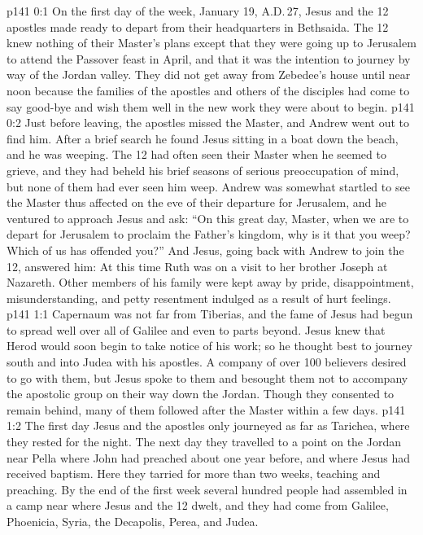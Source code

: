 \author{Midwayer Commission}
\vs p141 0:1 On the first day of the week, January 19, A.D.\,27, Jesus and the 12 apostles made ready to depart from their headquarters in Bethsaida. The 12 knew nothing of their Master’s plans except that they were going up to Jerusalem to attend the Passover feast in April, and that it was the intention to journey by way of the Jordan valley. They did not get away from Zebedee’s house until near noon because the families of the apostles and others of the disciples had come to say good\hyp{}bye and wish them well in the new work they were about to begin.
\vs p141 0:2 Just before leaving, the apostles missed the Master, and Andrew went out to find him. After a brief search he found Jesus sitting in a boat down the beach, and he was weeping. The 12 had often seen their Master when he seemed to grieve, and they had beheld his brief seasons of serious preoccupation of mind, but none of them had ever seen him weep. Andrew was somewhat startled to see the Master thus affected on the eve of their departure for Jerusalem, and he ventured to approach Jesus and ask: “On this great day, Master, when we are to depart for Jerusalem to proclaim the Father’s kingdom, why is it that you weep? Which of us has offended you?” And Jesus, going back with Andrew to join the 12, answered him:  At this time Ruth was on a visit to her brother Joseph at Nazareth. Other members of his family were kept away by pride, disappointment, misunderstanding, and petty resentment indulged as a result of hurt feelings.
\vs p141 1:1 Capernaum was not far from Tiberias, and the fame of Jesus had begun to spread well over all of Galilee and even to parts beyond. Jesus knew that Herod would soon begin to take notice of his work; so he thought best to journey south and into Judea with his apostles. A company of over 100 believers desired to go with them, but Jesus spoke to them and besought them not to accompany the apostolic group on their way down the Jordan. Though they consented to remain behind, many of them followed after the Master within a few days.
\vs p141 1:2 The first day Jesus and the apostles only journeyed as far as Tarichea, where they rested for the night. The next day they travelled to a point on the Jordan near Pella where John had preached about one year before, and where Jesus had received baptism. Here they tarried for more than two weeks, teaching and preaching. By the end of the first week several hundred people had assembled in a camp near where Jesus and the 12 dwelt, and they had come from Galilee, Phoenicia, Syria, the Decapolis, Perea, and Judea.
